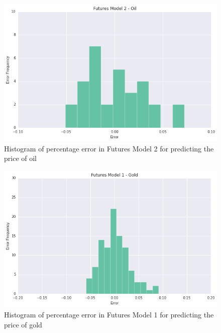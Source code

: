 \documentclass[runningheads]{llncs}
\begin{document}
\begin{figure}
\centering
\includegraphics[width=\textwidth]{futures_oil2.png}
\caption{Histogram of percentage error in  Futures Model 2 for predicting the price of oil}
\label{fig:futures_oil2.png}
\end{figure}


\begin{figure}
\centering
\includegraphics[width=\textwidth]{futures_gold1.png}
\caption{Histogram of percentage error in Futures Model 1 for predicting the price of gold}
\label{fig:futures_gold1.png}
\end{figure}
\end{document}
